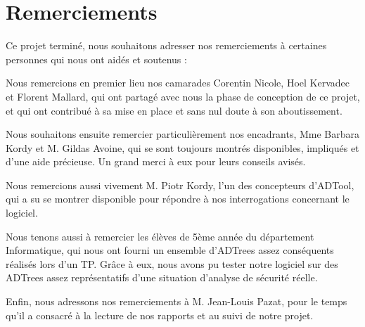 \section{Remerciements}

Ce projet terminé, nous souhaitons adresser nos remerciements à certaines personnes qui nous ont aidés et soutenus :   

Nous remercions en premier lieu nos camarades Corentin {\sc Nicole}, Hoel {\sc Kervadec} et Florent {\sc Mallard}, qui ont partagé avec nous la phase de conception de ce projet, et qui ont contribué à sa mise en place et sans nul doute à son aboutissement.

Nous souhaitons ensuite remercier particulièrement nos encadrants, Mme Barbara {\sc Kordy} et M. Gildas {\sc Avoine}, qui se sont toujours montrés disponibles, impliqués et d'une aide précieuse. Un grand merci à eux pour leurs conseils avisés.

Nous remercions aussi vivement M. Piotr {\sc Kordy}, l'un des concepteurs d'ADTool, qui a su se montrer disponible pour répondre à nos interrogations concernant le logiciel.

Nous tenons aussi à remercier les élèves de 5ème année du département Informatique, qui nous ont fourni un ensemble d'ADTrees assez conséquents réalisés lors d'un TP. Grâce à eux, nous avons pu tester notre logiciel sur des ADTrees assez représentatifs d'une situation d'analyse de sécurité réelle.

Enfin, nous adressons nos remerciements à M. Jean-Louis {\sc Pazat}, pour le temps qu'il a consacré à la lecture de nos rapports et au suivi de notre projet.